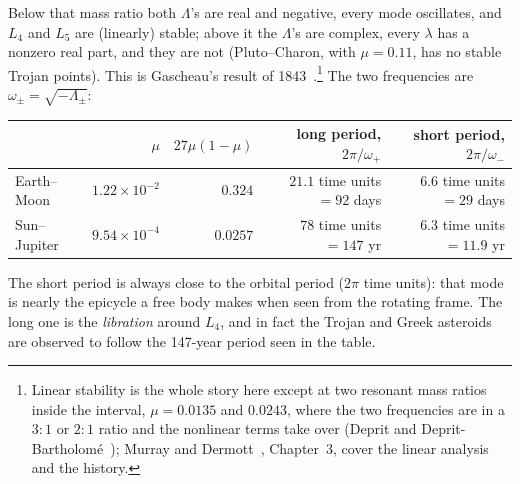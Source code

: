 \documentclass[12pt]{article}
\numberwithin{equation}{section}
\begin{document}
\begin{tcolorbox}[enhanced,breakable,colback=gray!8,colframe=gray!45,boxrule=0.5pt,
    left=5pt,right=5pt,top=5pt,bottom=5pt]
Below that mass ratio both $\Lambda$'s are real and negative, every mode oscillates, and
$L_4$ and $L_5$ are (linearly) stable; above it the $\Lambda$'s are complex, every $\lambda$
has a nonzero real part, and they are not (Pluto--Charon, with $\mu = 0.11$, has no stable
Trojan points). This is Gascheau's result of 1843~\cite{gascheau}.\footnote{Linear stability is the whole
  story here except at two resonant mass ratios inside the interval, $\mu = 0.0135$ and
  $0.0243$, where the two frequencies are in a $3{:}1$ or $2{:}1$ ratio and the nonlinear terms
  take over (Deprit and Deprit-Bartholom\'e~\cite{deprit}); Murray and
  Dermott~\cite{murray}, Chapter~3, cover the linear analysis and the history.} The two
frequencies are $\omega_\pm = \sqrt{-\Lambda_\pm}$:
\begin{center}
\small
\begin{tabular}{lrrrr}
\toprule
 & $\mu$ & $27\mu(1-\mu)$ & long period, $2\pi/\omega_+$ & short period, $2\pi/\omega_-$ \\
\midrule
Earth--Moon  & $1.22\times 10^{-2}$ & $0.324$  & $21.1$ time units $= 92$ days & $6.6$ time units $= 29$ days \\
Sun--Jupiter & $9.54\times 10^{-4}$ & $0.0257$ & $78$ time units $= 147$ yr & $6.3$ time units $= 11.9$ yr \\
\bottomrule
\end{tabular}
\end{center}
\noindent The short period is always close to the orbital period ($2\pi$ time units): that mode
is nearly the epicycle a free body makes when seen from the rotating frame. The long one is the
\emph{libration} around $L_4$, and in fact the Trojan and Greek asteroids
are observed to follow the 147-year period seen in the table.

\end{tcolorbox}

\medskip
\end{document}
